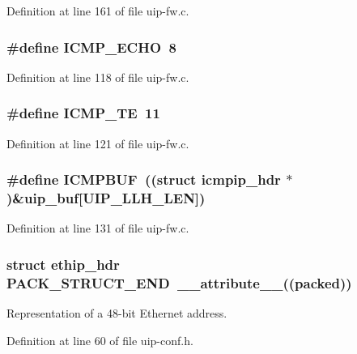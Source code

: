 Definition at line 161 of file uip-\/fw.c.

\hypertarget{group__uipfw_gad58231410d58e34b455328b888a9e73c}{
\subsubsection[{ICMP\_\-ECHO}]{\setlength{\rightskip}{0pt plus 5cm}\#define ICMP\_\-ECHO~8}}
\label{group__uipfw_gad58231410d58e34b455328b888a9e73c}


Definition at line 118 of file uip-\/fw.c.

\hypertarget{group__uipfw_ga58e03a47804158d97a9c069cc2204797}{
\subsubsection[{ICMP\_\-TE}]{\setlength{\rightskip}{0pt plus 5cm}\#define ICMP\_\-TE~11}}
\label{group__uipfw_ga58e03a47804158d97a9c069cc2204797}


Definition at line 121 of file uip-\/fw.c.

\hypertarget{group__uipfw_ga4309376690872fa4beb4f025f5cc199b}{
\subsubsection[{ICMPBUF}]{\setlength{\rightskip}{0pt plus 5cm}\#define ICMPBUF~((struct {\bf icmpip\_\-hdr} $\ast$)\&{\bf uip\_\-buf}\mbox{[}UIP\_\-LLH\_\-LEN\mbox{]})}}
\label{group__uipfw_ga4309376690872fa4beb4f025f5cc199b}


Definition at line 131 of file uip-\/fw.c.

\hypertarget{group__uipfw_gae92a74cc7ea3eba5d3d56b9caa77d2ad}{
\subsubsection[{PACK\_\-STRUCT\_\-END}]{\setlength{\rightskip}{0pt plus 5cm}struct {\bf ethip\_\-hdr} {\bf PACK\_\-STRUCT\_\-END}~\_\-\_\-attribute\_\-\_\-((packed))}}
\label{group__uipfw_gae92a74cc7ea3eba5d3d56b9caa77d2ad}
Representation of a 48-\/bit Ethernet address. 

Definition at line 60 of file uip-\/conf.h.

